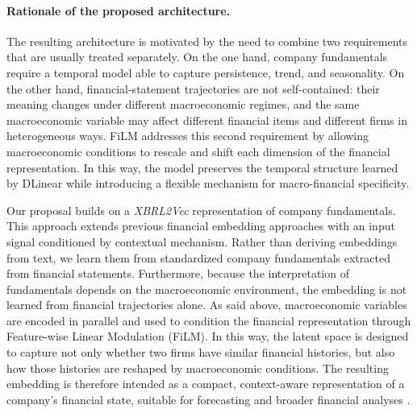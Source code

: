 \documentclass[a4paper,fleqn]{cas-dc}
\begin{document}
\paragraph{Rationale of the proposed architecture.}
The resulting architecture is motivated by the need to combine two requirements that are usually treated separately. On the one hand, company fundamentals require a temporal model able to capture persistence, trend, and seasonality. On the other hand, financial-statement trajectories are not self-contained: their meaning changes under different macroeconomic regimes, and the same macroeconomic variable may affect different financial items and different firms in heterogeneous ways. FiLM addresses this second requirement by allowing macroeconomic conditions to rescale and shift each dimension of the financial representation. In this way, the model preserves the temporal structure learned by DLinear while introducing a flexible mechanism for macro-financial specificity.

Our proposal builds on a \textit{XBRL2Vec} representation of company fundamentals. This approach extends previous financial embedding approaches with an input signal conditioned by contextual mechanism. Rather than deriving embeddings from text, we learn them from standardized company fundamentals extracted from financial statements. Furthermore, because the interpretation of fundamentals depends on the macroeconomic environment, the embedding is not learned from financial trajectories alone. As said above, macroeconomic variables are encoded in parallel and used to condition the financial representation through Feature-wise Linear Modulation (FiLM). In this way, the latent space is designed to capture not only whether two firms have similar financial histories, but also how those histories are reshaped by macroeconomic conditions. The resulting embedding is therefore intended as a compact, context-aware representation of a company's financial state, suitable for forecasting and broader financial analyses \citep{perez2018film,zeng_are_2023}.

\end{document}
